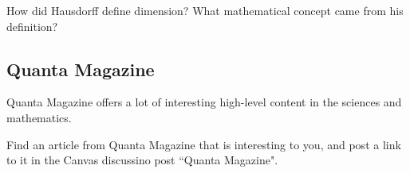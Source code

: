 \blanks
\blanks

\begin{exercise}
How did Hausdorff define dimension? What mathematical concept came from his definition?
\end{exercise}

\blanks
\blanks

\subsection{Quanta Magazine}

Quanta Magazine offers a lot of interesting high-level content in the sciences and mathematics.

\begin{exercise}
Find an article from Quanta Magazine that is interesting to you, and post a link to it in the Canvas discussino post ``Quanta Magazine".
\end{exercise}
